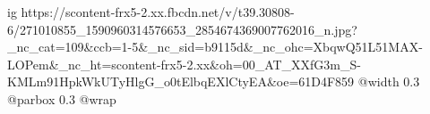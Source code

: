  
 
 
 
 

\ifcmt
  ig https://scontent-frx5-2.xx.fbcdn.net/v/t39.30808-6/271010855_1590960314576653_2854674369007762016_n.jpg?_nc_cat=109&ccb=1-5&_nc_sid=b9115d&_nc_ohc=XbqwQ51L51MAX-LOPem&_nc_ht=scontent-frx5-2.xx&oh=00_AT_XXfG3m_S-KMLm91HpkWkUTyHlgG_o0tElbqEXlCtyEA&oe=61D4F859
  @width 0.3
  @parbox 0.3
  @wrap \parpic[l]
\fi
